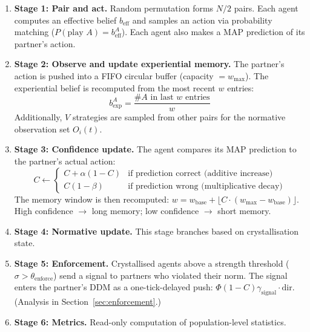 \documentclass[11pt,a4paper]{article}
\begin{document}
\begin{enumerate}[nosep]
\item \textbf{Stage 1: Pair and act.} Random permutation forms $N/2$ pairs. Each agent computes an effective belief $b_{\mathrm{eff}}$ and samples an action via probability matching ($P(\text{play } A) = b_{\mathrm{eff}}^A$). Each agent also makes a MAP prediction of its partner's action.

\item \textbf{Stage 2: Observe and update experiential memory.} The partner's action is pushed into a FIFO circular buffer (capacity $= w_{\max}$). The experiential belief is recomputed from the most recent $w$ entries:
\begin{equation}
b_{\exp}^A = \frac{\#A \text{ in last } w \text{ entries}}{w}
\label{eq:bexp}
\end{equation}
Additionally, $V$ strategies are sampled from other pairs for the normative observation set $O_i(t)$.

\item \textbf{Stage 3: Confidence update.} The agent compares its MAP prediction to the partner's actual action:
\begin{equation}
C \leftarrow \begin{cases}
C + \alpha(1 - C) & \text{if prediction correct (additive increase)} \\
C(1 - \beta) & \text{if prediction wrong (multiplicative decay)}
\end{cases}
\label{eq:confidence}
\end{equation}
The memory window is then recomputed: $w = w_{\mathrm{base}} + \lfloor C \cdot (w_{\max} - w_{\mathrm{base}}) \rfloor$. High confidence $\to$ long memory; low confidence $\to$ short memory.

\item \textbf{Stage 4: Normative update.} This stage branches based on crystallisation state.

\item \textbf{Stage 5: Enforcement.} Crystallised agents above a strength threshold ($\sigma > \theta_{\mathrm{enforce}}$) send a signal to partners who violated their norm. The signal enters the partner's DDM as a one-tick-delayed push: $\Phi (1-C) \gamma_{\mathrm{signal}} \cdot \mathrm{dir}$. (Analysis in Section~\ref{sec:enforcement}.)

\item \textbf{Stage 6: Metrics.} Read-only computation of population-level statistics.
\end{enumerate}
\end{document}
